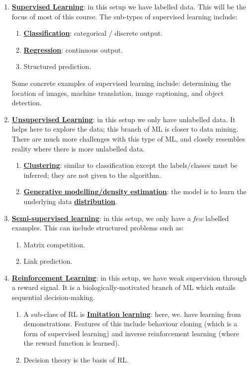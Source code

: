 \documentclass[11pt]{scrartcl}
\theoremstyle{definition}
\theoremstyle{remark}
\newcommand{\dfn}[1]{\textbf{\underline{#1}}}
\begin{document}
\begin{enumerate}[noitemsep]
	\item \dfn{Supervised Learning}: in this setup we have labelled data. This will be the focus of most of this course. The sub-types of supervised learning include: 
	\begin{enumerate}[noitemsep]
		\item \dfn{Classification}: categorical / discrete output. 
		\item \dfn{Regression}: continuous output. 
		\item Structured prediction. 
	\end{enumerate}
	Some concrete examples of supervised learning include: determining the location of images, machine translation, image captioning, and object detection. 
	\item \dfn{Unsupervised Learning}: in this setup we only have unlabelled data. It helps here to explore the data; this branch of ML is closer to data mining. There are much more challenges with this type of ML, and closely resembles reality where there is more unlabelled data. 
	\begin{enumerate}[noitemsep]
		\item \dfn{Clustering}: similar to classification except the labels/classes must be inferred; they are not given to the algorithm. 
		\item \dfn{Generative modelling/density estimation}: the model is to learn the underlying data \dfn{distribution}. 
	\end{enumerate}
	\item \dfn{Semi-supervised learning}: in this setup, we only have a \emph{few} labelled examples. This can include structured problems such as: 
	\begin{enumerate}[noitemsep]
		\item Matrix competition. 
		\item Link prediction. 
	\end{enumerate}
	\item \dfn{Reinforcement Learning}: in this setup, we have weak supervision through a reward signal. It is a biologically-motivated branch of ML which entails sequential decision-making. 
	\begin{enumerate}[noitemsep]
		\item A sub-class of RL is \dfn{Imitation learning}: here, we. have learning from demonstrations. Features of this include behaviour cloning (which is a form of supervised learning) and inverse reinforcement learning (where the reward function is learned). 
		\item Decision theory is the basis of RL. 
	\end{enumerate}
\end{enumerate}
\end{document}
